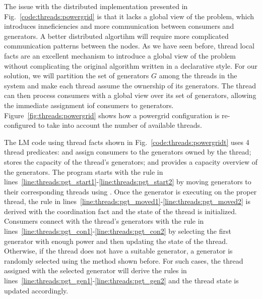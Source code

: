 The issue with the distributed implementation presented in
Fig.~\ref{code:threads:powergrid} is that it lacks a global view of the problem,
which introduces inneficiencies and more communication between consumers and
generators. A better distributed algortihm will require more complicated
communication patterns between the nodes.  As we have seen before, thread local
facts are an excellent mechanism to introduce a global view of the problem
without complicating the original algorithm written in a declarative style. For
our solution, we will partition the set of generators $G$ among the threads in
the system and make each thread assume the ownership of its generators. The
thread can then process consumers with a global view over its set of generators,
allowing the immediate assignment iof consumers to generators.
Figure~\ref{fig:threads:powergrid} shows how a powergrid configuration is
re-configured to take into account the number of available threads.

The LM code using thread facts shown in Fig.~\ref{code:threads:powergridt} uses
4 thread predicates:  and
 assign consumers to the generators owned by the
thread;  stores the capacity of the thread's generators;
and  provides a capacity overview of the generators.
The program starts with the rule in
lines~\ref{line:threads:pgt_start1}-\ref{line:threads:pgt_start2} by moving
generators to their corresponding threads using . Once the
generator is executing on the proper thread, the rule in
lines~\ref{line:threads:pgt_moved1}-\ref{line:threads:pgt_moved2} is derived
with the  coordination fact and the state of the thread is
initialized.  Consumers connect with the thread's generators with the rule in
lines~\ref{line:threads:pgt_con1}-\ref{line:threads:pgt_con2} by selecting the
first generator with enough power and then updating the state of the thread.
Otherwise, if the thread does not have a suitable generator, a generator is
randomly selected using the method shown before. For such cases, the thread
assigned with the selected generator will derive the rules in
lines~\ref{line:threads:pgt_gen1}-\ref{line:threads:pgt_gen2} and the thread
state is updated accordingly.

